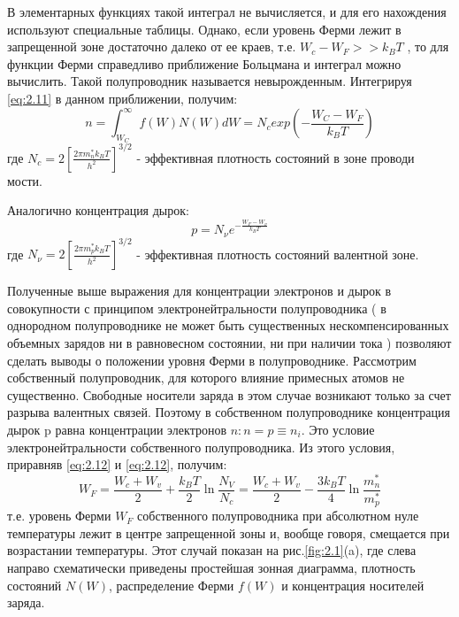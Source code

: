 В элементарных функциях такой интеграл не вычисляется, и для его нахождения используют специальные таблицы. Однако, если
уровень Ферми лежит в запрещенной зоне достаточно далеко от ее краев, т.е. $W_c - W_F>>k_B T$ , то для функции Ферми
справедливо приближение Больцмана и интеграл можно вычислить. Такой полупроводник называется невырожденным. Интегрируя
\eqref{eq:2.11} в данном приближении, получим: 
\begin{equation}
	n=\int_{W_{C}}^{\infty} f(W) N(W) d W=N_{c} exp(-\frac{W_C-W_F}{k_B T})
	\label{eq:2.12}
\end{equation}
где $N_{c}=2\left[\frac{2 \pi m_{n}^{*} k_{B} T}{h^{2}}\right]^{3 / 2}$ - эффективная плотность состояний в зоне проводи
мости.

Аналогично концентрация дырок: 
\begin{equation}
	p=N_{\nu} e^{-\frac{W_{F}-W_{\nu}}{k_{B} T}}
	\label{eq:2.13}
\end{equation}
где $N_{\nu}=2\left[\frac{2 \pi m_{p}^{*} k_{B} T}{h^{2}}\right]^{3 / 2}$ - эффективная плотность состояний валентной зоне.

Полученные выше выражения для концентрации электронов и дырок в совокупности с принципом электронейтральности
полупроводника ( в однородном полупроводнике не может быть существенных нескомпенсированных объемных зарядов ни в
равновесном состоянии, ни при наличии тока ) позволяют сделать выводы о положении уровня Ферми в полупроводнике.
Рассмотрим собственный полупроводник, для которого влияние примесных атомов не существенно. Свободные носители заряда в
этом случае возникают только за счет разрыва валентных связей. Поэтому в собственном полупроводнике концентрация дырок p
равна концентрации электронов $ n: n = p \equiv n_i$. Это условие электронейтральности собственного полупроводника. Из этого
условия, приравняв \eqref{eq:2.12} и \eqref{eq:2.12}, получим:
\begin{equation}
	W_{F}=\frac{W_{c}+W_{v}}{2}+\frac{k_{B} T}{2} \ln \frac{N_{V}}{N_{c}}=\frac{W_{c}+W_{v}}{2}-\frac{3 k_{B} T}{4} \ln \frac{m_{n}^{*}}{m_{p}^{*}}
	\label{eq:2.14}
\end{equation}
т.е. уровень Ферми $W_F$ собственного полупроводника при абсолютном нуле температуры лежит в центре запрещенной зоны и,
вообще говоря, смещается при возрастании температуры. Этот случай показан на рис.\ref{fig:2.1}(a), где слева направо схематически
приведены простейшая зонная диаграмма, плотность состояний $N(W)$, распределение Ферми $f (W)$ и концентрация носителей
заряда.


